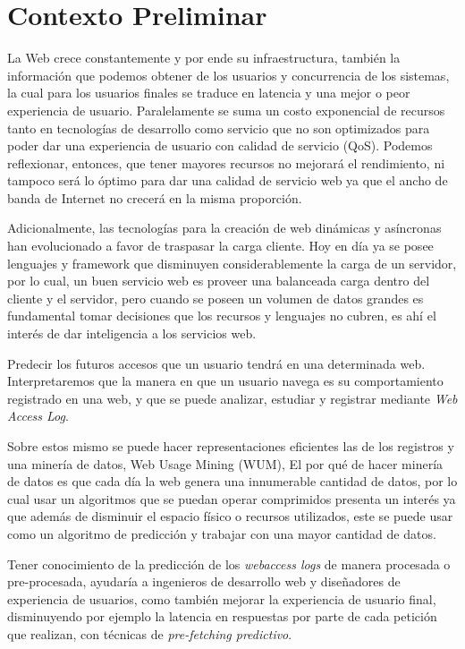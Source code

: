 \section{Contexto Preliminar} 
\label{sec:preliminar}


  La Web crece constantemente y por ende su infraestructura, también la información que podemos obtener de los  usuarios y  concurrencia de los sistemas, la cual para los usuarios finales se traduce en latencia y una mejor o peor experiencia de usuario. Paralelamente se suma un costo exponencial de recursos tanto en tecnologías de desarrollo como servicio que no son optimizados para poder dar una experiencia de usuario con calidad de servicio (QoS). Podemos reflexionar, entonces, que tener mayores recursos no mejorará el rendimiento, ni tampoco será lo óptimo para dar una calidad de servicio web ya que el ancho de banda de Internet no crecerá en la misma proporción.
   
  Adicionalmente, las tecnologías para la creación de web dinámicas y asíncronas han evolucionado a favor de traspasar la carga cliente.
  Hoy en día ya se posee lenguajes y framework que disminuyen considerablemente la carga de un servidor, por lo cual, un buen servicio web es proveer una balanceada carga dentro del cliente y el servidor, pero cuando se poseen un volumen de datos grandes es fundamental tomar decisiones que los recursos y lenguajes no cubren, es ahí el interés de dar inteligencia a los servicios web.

  Predecir los futuros accesos que un usuario tendrá en una determinada web. Interpretaremos que la manera en que un usuario navega es su comportamiento registrado en una web, y que se puede analizar, estudiar y registrar mediante \emph{Web Access Log}. 

  Sobre estos mismo se puede hacer representaciones eficientes\cite{Claude2014} las de los registros y una minería de datos, Web Usage Mining (WUM), El por qué de hacer minería de datos es que cada día la web genera una innumerable cantidad de datos, por lo cual usar un algoritmos que se puedan operar comprimidos presenta un interés ya que además de disminuir el espacio físico o recursos utilizados, este se puede usar como un algoritmo de predicción y trabajar con una mayor cantidad de datos.
  
  Tener conocimiento de la predicción de los \emph{webaccess logs} de manera procesada o pre-procesada, ayudaría a ingenieros de desarrollo web y diseñadores de experiencia de usuarios, como también mejorar la experiencia de usuario final, disminuyendo por ejemplo la latencia en respuestas por parte de cada petición que realizan, con técnicas de \emph{pre-fetching predictivo}.
  

